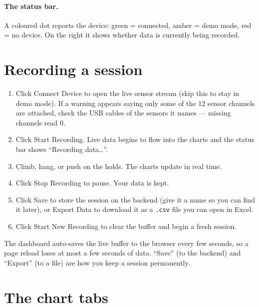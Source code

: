 \documentclass[11pt,a4paper]{article}
\begin{document}
\paragraph{The status bar.}
A coloured dot reports the device: \textcolor{green!55!black}{green} = connected,
amber = demo mode, red = no device. On the right it shows whether data is currently
being recorded.

\section{Recording a session}

\begin{enumerate}[leftmargin=1.6em]
  \item Click \textsf{Connect Device} to open the live sensor stream (skip this to
        stay in demo mode). If a warning appears saying only some of the 12 sensor
        channels are attached, check the USB cables of the sensors it names ---
        missing channels read 0.
  \item Click \textsf{Start Recording}. Live data begins to flow into the charts
        and the status bar shows ``Recording data\ldots''.
  \item Climb, hang, or push on the holds. The charts update in real time.
  \item Click \textsf{Stop Recording} to pause. Your data is kept.
  \item Click \textsf{Save} to store the session on the backend (give it a name so
        you can find it later), or \textsf{Export Data} to download it as a
        \texttt{.csv} file you can open in Excel.
  \item Click \textsf{Start New Recording} to clear the buffer and begin a fresh
        session.
\end{enumerate}

\begin{infobox}
The dashboard auto-saves the live buffer to the browser every few seconds, so a
page reload loses at most a few seconds of data. ``Save'' (to the backend) and
``Export'' (to a file) are how you keep a session permanently.
\end{infobox}

\section{The chart tabs}
\end{document}
